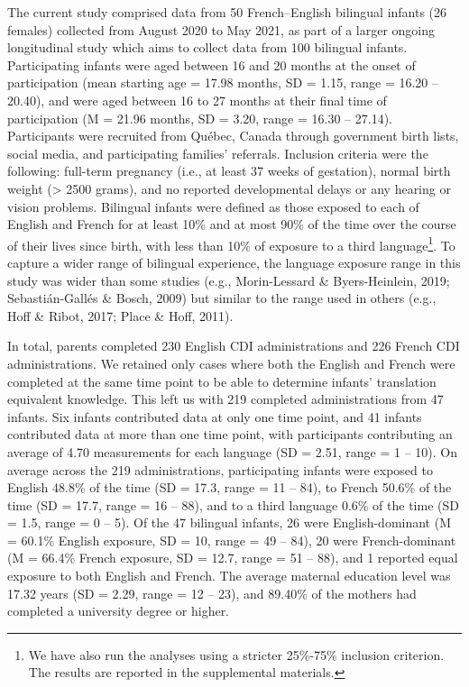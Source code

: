 \documentclass[
  ,man,floatsintext]{apa6}
\begin{document}
The current study comprised data from 50 French--English bilingual infants (26 females) collected from August 2020 to May 2021, as part of a larger ongoing longitudinal study which aims to collect data from 100 bilingual infants. Participating infants were aged between 16 and 20 months at the onset of participation (mean starting age = 17.98 months, SD = 1.15, range = 16.20 -- 20.40), and were aged between 16 to 27 months at their final time of participation (M = 21.96 months, SD = 3.20, range = 16.30 -- 27.14). Participants were recruited from Québec, Canada through government birth lists, social media, and participating families' referrals. Inclusion criteria were the following: full-term pregnancy (i.e., at least 37 weeks of gestation), normal birth weight (\textgreater{} 2500 grams), and no reported developmental delays or any hearing or vision problems. Bilingual infants were defined as those exposed to each of English and French for at least 10\% and at most 90\% of the time over the course of their lives since birth, with less than 10\% of exposure to a third language\footnote{We have also run the analyses using a stricter 25\%-75\% inclusion criterion. The results are reported in the supplemental materials.}. To capture a wider range of bilingual experience, the language exposure range in this study was wider than some studies (e.g., Morin-Lessard \& Byers-Heinlein, 2019; Sebastián-Gallés \& Bosch, 2009) but similar to the range used in others (e.g., Hoff \& Ribot, 2017; Place \& Hoff, 2011).

In total, parents completed 230 English CDI administrations and 226 French CDI administrations. We retained only cases where both the English and French were completed at the same time point to be able to determine infants' translation equivalent knowledge. This left us with 219 completed administrations from 47 infants. Six infants contributed data at only one time point, and 41 infants contributed data at more than one time point, with participants contributing an average of 4.70 measurements for each language (SD = 2.51, range = 1 -- 10). On average across the 219 administrations, participating infants were exposed to English 48.8\% of the time (SD = 17.3, range = 11 -- 84), to French 50.6\% of the time (SD = 17.7, range = 16 -- 88), and to a third language 0.6\% of the time (SD = 1.5, range = 0 -- 5). Of the 47 bilingual infants, 26 were English-dominant (M = 60.1\% English exposure, SD = 10, range = 49 -- 84), 20 were French-dominant (M = 66.4\% French exposure, SD = 12.7, range = 51 -- 88), and 1 reported equal exposure to both English and French. The average maternal education level was 17.32 years (SD = 2.29, range = 12 -- 23), and 89.40\% of the mothers had completed a university degree or higher.
\end{document}
